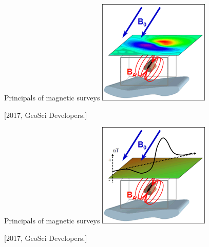 \begin{frame}
  \begin{PointSix}{Principals of magnetic surveys}
    \includegraphics[width=0.80\linewidth]{Figures/Magnetics/magnetic_anomaly.png}

  \tiny [2017, GeoSci Developers.]
  \end{PointSix}
\end{frame}

\begin{frame}
  \begin{PointSix}{Principals of magnetic surveys}
    \includegraphics[width=0.80\linewidth]{Figures/Magnetics/measurements.png}

  \tiny [2017, GeoSci Developers.]
  \end{PointSix}
\end{frame}




